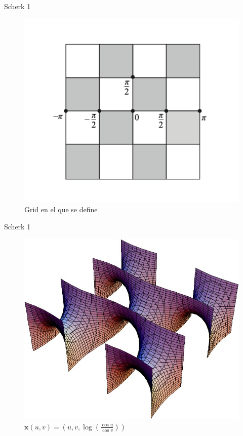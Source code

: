 \documentclass[10pt]{beamer}
\begin{document}
    \begin{frame}{Scherk 1}
      \begin{figure}[H]
        \centering
        \includegraphics[scale=.4]{imagenes/8}
        \caption{Grid en el que se define}
      \end{figure}
      \end{frame}


    \begin{frame}{Scherk 1}
      \begin{figure}[H]
        \centering
        \includegraphics[scale=.4]{imagenes/4}
        \caption{$\mathbf{x}(u,v)=(u,v, \log \left(\frac{\cos u}{\cos v}\right))$}
      \end{figure}
      \end{frame}
\end{document}
